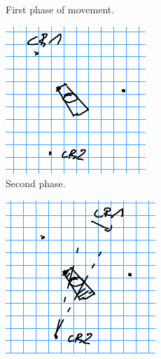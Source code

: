 \documentclass[english,RandD]{rapportPFE}  %
\begin{document}
\begin{figure}[h!]
\begin{subfigure}[t]{0.3\linewidth}
						\caption{First phase of movement.}
						\label{fig:triangle_2}
					\end{subfigure}
					\hfill
					\begin{subfigure}[t]{0.3\linewidth}
						\centering
						\includegraphics[width=\linewidth]{graphics/triangle_3.png}
						\caption{Second phase.}
						\label{fig:triangle_3}
					\end{subfigure}
					\hfill
					\begin{subfigure}[t]{0.3\linewidth}
						\centering
						\includegraphics[width=\linewidth]{graphics/triangle_4.png}

\end{subfigure}
\end{figure}
\end{document}
